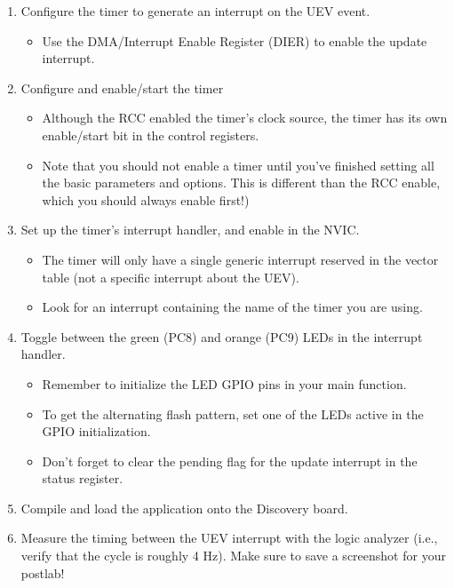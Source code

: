 \documentclass[openany,11pt,fleqn]{book} %
\begin{document}
\begin{exercise}
\begin{enumerate}
            \item Configure the timer to generate an interrupt on the UEV event.     
                \begin{itemize}
                    \item Use the DMA/Interrupt Enable Register (DIER) to enable the update interrupt. 
                \end{itemize}
             \item Configure and enable/start the timer
             \begin{itemize}
                 \item Although the RCC enabled the timer's clock source, the timer has its own enable/start bit in the control registers. 
                 \item Note that you should not enable a timer until you've finished setting all the basic parameters and options. This is different than the RCC enable, which you should always enable first!)
             \end{itemize}
             \item Set up the timer's interrupt handler, and enable in the NVIC.
             \begin{itemize}
                \item The timer will only have a single generic interrupt reserved in the vector table (not a specific interrupt about the UEV). 
                \item Look for an interrupt containing the name of the timer you are using. 
            \end{itemize}
            \item Toggle between the green (PC8) and orange (PC9) LEDs in the interrupt handler. 
            \begin{itemize}
                \item Remember to initialize the LED GPIO pins in your main function. 
                \item To get the alternating flash pattern, set one of the LEDs active in the GPIO initialization.
                \item Don't forget to clear the pending flag for the update interrupt in the status register. 
            \end{itemize}
            \item Compile and load the application onto the Discovery board.
            \item Measure the timing between the UEV interrupt with the logic analyzer (i.e., verify that the cycle is roughly 4 Hz). Make sure to save a screenshot for your postlab!
        \end{enumerate}
        
    \end{exercise}
\end{document}
